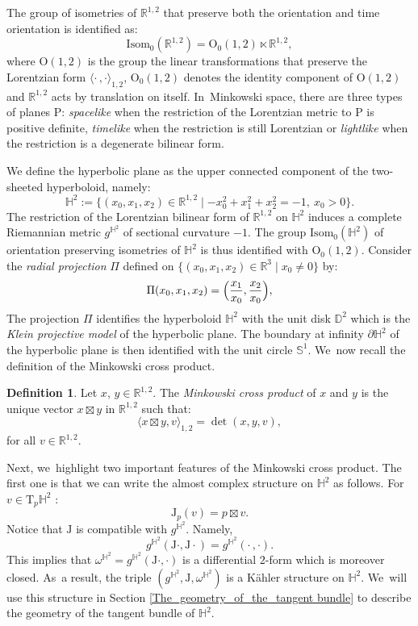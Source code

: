 \documentclass[10pt]{amsart}
\theoremstyle{plain}
\theoremstyle{definition}
\newtheorem{defi}[cor]{Definition}
\newcommand{\minko}{\mathbb{R}^{1,2}}
\newcommand{\isom}{\mathrm{Isom}_0}
\newcommand{\J}{\mathrm{J}}
\newcommand{\inner}[1] {\langle #1 \rangle}
\newcommand{\inners}{\langle \cdot\,, \cdot \rangle}
\begin{document}
The group of isometries of $\minko$ that preserve both the orientation and time orientation is identified as:
\[
\mathrm{Isom}_0(\minko)=\mathrm{O}_0(1,2)\ltimes\minko,
\]
where $\mathrm{O}(1,2)$ is the group the linear transformations that preserve the Lorentzian form $\inners_{1,2}$, $\mathrm{O}_0(1,2)$ denotes the identity component of $\mathrm{O}(1,2)$ and $\minko$ acts by translation on itself. In~Minkowski space, there are three types of planes $\mathrm{P}$: \emph{spacelike} when the restriction of the Lorentzian metric to $\mathrm{P}$ is positive definite, \emph{timelike} when the restriction is still Lorentzian or \emph{lightlike} when the restriction is a degenerate bilinear form.

We define the hyperbolic plane as the upper connected component of the two-sheeted hyperboloid,
namely:
\begin{equation}\label{hyperboloid}
\mathbb{H}^2:=\{(x_0,x_1,x_2)\in \mathbb{R}^{1,2}\mid -x_0^2+x_1^2+x_2^2=-1, \ x_0>0\}.
\end{equation}
The restriction of the Lorentzian bilinear form of $\minko$ on $\mathbb{H}^2$ induces a complete Riemannian metric $g^{\mathbb{H}^2}$ of sectional curvature $-1$. The group $\isom(\mathbb{H}^2)$ of orientation preserving isometries of $\mathbb{H}^2$ is thus identified with $\mathrm{O}_0(1,2)$. Consider the \emph{radial projection} $\Pi$ defined on $\{(x_0,x_1,x_2)\in\mathbb{R}^3\mid x_0\neq 0\}$ by:
\begin{equation}\label{radial}
\Pi(x_0,x_1,x_2)=\Bigl(\frac{x_1}{x_0},\frac{x_2}{x_0} \Bigr),
\end{equation}
The projection $\Pi$ identifies the hyperboloid $\mathbb{H}^2$ with the unit disk $\mathbb{D}^2$ which is the \emph{Klein projective model} of the hyperbolic plane. The boundary at infinity $\partial\mathbb{H}^2$ of the hyperbolic plane is then identified with the unit circle $\mathbb{S}^1$. We~now recall the definition of the Minkowski cross product.
\begin{defi}
Let $x$, $y\in \minko$. The \emph{Minkowski cross product} of $x$ and $y$ is the unique vector $x\boxtimes y$ in $\minko$ such that:
\[
\inner{x\boxtimes y,v}_{1,2}=\det(x,y,v),
\]
for all $v\in \minko$.
\end{defi}
Next, we~highlight two important features of the Minkowski cross product. The first one is that we can write the almost complex structure on $\mathbb{H}^2$ as follows. For $v\in\mathrm{T}_p\mathbb{H}^2$ :
\begin{equation}\label{complex_structure_H2}
\J_p(v)=p\boxtimes v.
\end{equation}
Notice that $\J$ is compatible with $g^{\mathbb{H}^2}$. Namely,
\[
g^{\mathbb{H}^2}(\J\cdot,\J\cdot)=g^{\mathbb{H}^2}(\cdot\,,\cdot).
\]
This implies that $\omega^{\mathbb{H}^2}=g^{\mathbb{H}^2}(\J\cdot,\cdot)$ is a differential $2$-form which is moreover closed. As~a result, the triple $(g^{\mathbb{H}^2}, \J, \omega^{\mathbb{H}^2})$ is a Kähler structure on $\mathbb{H}^2$. We~will use this structure in Section \ref{The_geometry_of_the_tangent bundle} to describe the geometry of the tangent bundle of $\mathbb{H}^2$.
\end{document}

